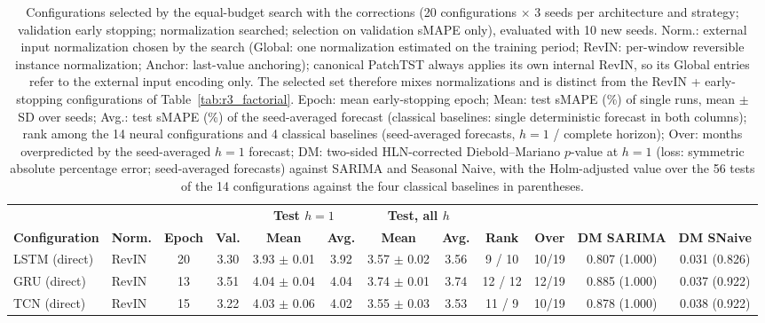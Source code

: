 \begin{table}[htbp]
\centering
\caption{Configurations selected by the equal-budget search with the corrections (20 configurations $\times$ 3 seeds per architecture and strategy; validation early stopping; normalization searched; selection on validation sMAPE only), evaluated with 10 new seeds. Norm.: external input normalization chosen by the search (Global: one normalization estimated on the training period; RevIN: per-window reversible instance normalization; Anchor: last-value anchoring); canonical PatchTST always applies its own internal RevIN, so its Global entries refer to the external input encoding only. The selected set therefore mixes normalizations and is distinct from the RevIN + early-stopping configurations of Table~\ref{tab:r3_factorial}. Epoch: mean early-stopping epoch; Mean: test sMAPE (\%) of single runs, mean $\pm$ SD over seeds; Avg.: test sMAPE (\%) of the seed-averaged forecast (classical baselines: single deterministic forecast in both columns); rank among the 14 neural configurations and 4 classical baselines (seed-averaged forecasts, $h=1$ / complete horizon); Over: months overpredicted by the seed-averaged $h=1$ forecast; DM: two-sided HLN-corrected Diebold--Mariano $p$-value at $h=1$ (loss: symmetric absolute percentage error; seed-averaged forecasts) against SARIMA and Seasonal Naive, with the Holm-adjusted value over the 56 tests of the 14 configurations against the four classical baselines in parentheses.}
\label{tab:r3_tuned}
\vspace{4pt}
\small
\begin{adjustbox}{max width=\textwidth}
\begin{tabular}{llcccccccccc}
\toprule
& & & & \multicolumn{2}{c}{\textbf{Test $h=1$}} & \multicolumn{2}{c}{\textbf{Test, all $h$}} & & & & \\
\cmidrule(lr){5-6}\cmidrule(lr){7-8}
\textbf{Configuration} & \textbf{Norm.} & \textbf{Epoch} & \textbf{Val.} & \textbf{Mean} & \textbf{Avg.} & \textbf{Mean} & \textbf{Avg.} & \textbf{Rank} & \textbf{Over} & \textbf{DM SARIMA} & \textbf{DM SNaive} \\
\midrule
LSTM (direct) & RevIN & 20 & 3.30 & 3.93 $\pm$ 0.01 & 3.92 & 3.57 $\pm$ 0.02 & 3.56 & 9 / 10 & 10/19 & 0.807 (1.000) & 0.031 (0.826) \\
GRU (direct) & RevIN & 13 & 3.51 & 4.04 $\pm$ 0.04 & 4.04 & 3.74 $\pm$ 0.01 & 3.74 & 12 / 12 & 12/19 & 0.885 (1.000) & 0.037 (0.922) \\
TCN (direct) & RevIN & 15 & 3.22 & 4.03 $\pm$ 0.06 & 4.02 & 3.55 $\pm$ 0.03 & 3.53 & 11 / 9 & 10/19 & 0.878 (1.000) & 0.038 (0.922) \\

\end{tabular}
\end{adjustbox}
\end{table}
